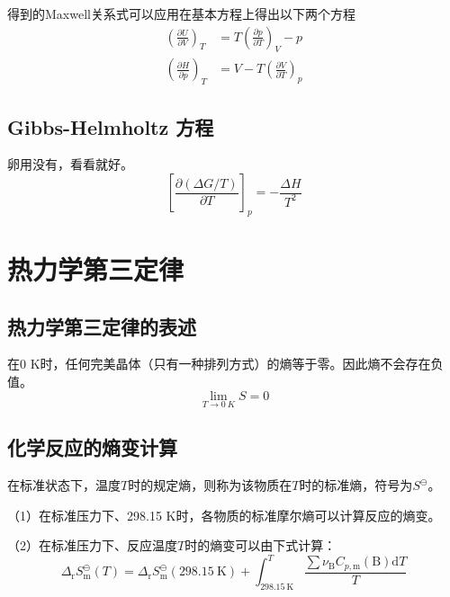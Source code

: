 \documentclass[lang=cn,newtx,11pt,scheme=chinese]{elegantbook}
\begin{document}
得到的Maxwell关系式可以应用在基本方程上得出以下两个方程
\begin{equation}
	\begin{aligned}
		\left ( \frac{\partial U}{\partial V}  \right )_T &= T\left ( \frac{\partial p}{\partial T}  \right )_V-p \\[1.5ex] 
		\left ( \frac{\partial H}{\partial p}  \right )_T &= V-T\left ( \frac{\partial V}{\partial T}  \right )_p   
	\end{aligned}
\end{equation}

\subsection{Gibbs-Helmholtz 方程}
卵用没有，看看就好。
\begin{equation}
	\left [ \frac{\partial (\Delta G/T)}{\partial T}  \right ]_p=-\frac{\Delta H}{T^2} 
\end{equation}

\section{热力学第三定律}
\subsection{热力学第三定律的表述}
\begin{theorem}[热力学第三定律]
	在0 K时，任何完美晶体（只有一种排列方式）的熵等于零。因此熵不会存在负值。
	\begin{equation}
		\lim_{T \to 0 \ K}S=0 
	\end{equation}
\end{theorem}

\subsection{化学反应的熵变计算}
在标准状态下，温度$T$时的规定熵，则称为该物质在$T$时的标准熵，符号为$S^\ominus$。

（1）在标准压力下、298.15 K时，各物质的标准摩尔熵可以计算反应的熵变。

（2）在标准压力下、反应温度$T$时的熵变可以由下式计算：
\begin{equation}
	\Delta_\mathrm{r}S^\ominus_\mathrm{m}(T) = \Delta_\mathrm{r}S^\ominus_\mathrm{m}(298.15 \ \mathrm{K} ) + \int_{298.15 \ \mathrm{K} }^{T}\frac{\sum \nu _\mathrm{B}C_{p,\mathrm{m}}(\mathrm{B} ) \mathrm{d}T }{T}  
\end{equation}
\end{document}
